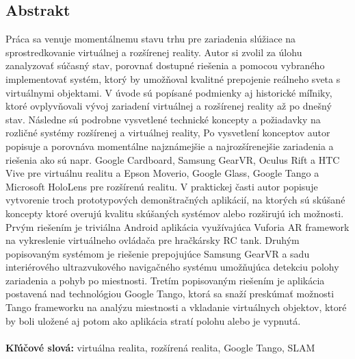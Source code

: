 \documentclass[12pt, a4paper]{article}
\newcommand{\specialsection}[1]
{
	\section*{#1}
	\addcontentsline{toc}{section}{\protect\numberline{}#1}
}
\begin{document}
\begin{titlepage}
\specialsection{Abstrakt}
Práca sa venuje momentálnemu stavu trhu pre zariadenia slúžiace na sprostredkovanie virtuálnej a rozšírenej reality. Autor si zvolil za úlohu zanalyzovať súčasný stav, porovnať dostupné riešenia a pomocou vybraného implementovať systém, ktorý by umožňoval kvalitné prepojenie reálneho sveta s virtuálnymi objektami. V úvode sú popísané podmienky aj historické míľniky, ktoré ovplyvňovali vývoj zariadení virtuálnej a rozšírenej reality až po dnešný stav. Následne sú podrobne vysvetlené technické koncepty a požiadavky na rozličné systémy rozšírenej a virtuálnej reality, Po vysvetlení konceptov autor popisuje a porovnáva momentálne najznámejšie a najrozšírenejšie zariadenia a riešenia ako sú napr. Google Cardboard, Samsung GearVR, Oculus Rift a HTC Vive pre virtuálnu realitu a Epson Moverio, Google Glass, Google Tango a Microsoft HoloLens pre rozšírenú realitu. V praktickej časti autor popisuje vytvorenie troch prototypových demonštračných aplikácií, na ktorých sú skúšané koncepty ktoré overujú kvalitu skúšaných systémov alebo rozširujú ich možnosti. Prvým riešením je triviálna Android aplikácia využívajúca Vuforia AR framework na vykreslenie virtuálneho ovládača pre hračkársky RC tank. Druhým popisovaným systémom je riešenie prepojujúce Samsung GearVR a sadu interiérového ultrazvukového navigačného systému umožňujúca detekciu polohy zariadenia a pohyb po miestnosti. Tretím popisovaným riešením je aplikácia postavená nad technológiou Google Tango, ktorá sa snaží preskúmať možnosti Tango frameworku na analýzu miestnosti a vkladanie virtuálnych objektov, ktoré by boli uložené aj potom ako aplikácia stratí polohu alebo je vypnutá.\\ \\
\textbf{Kľúčové slová:} virtuálna realita, rozšírená realita, Google Tango, SLAM
\end{titlepage}
\end{document}
